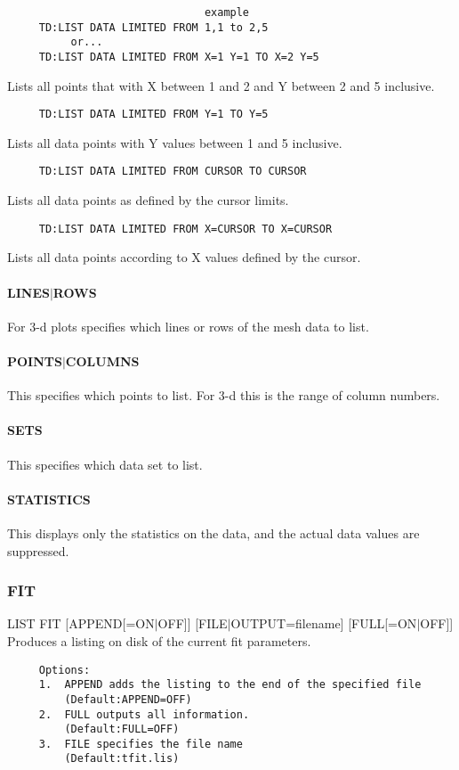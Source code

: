 \begin{verbatim}
                               example
     TD:LIST DATA LIMITED FROM 1,1 to 2,5 
          or...  
     TD:LIST DATA LIMITED FROM X=1 Y=1 TO X=2 Y=5 
\end{verbatim}
Lists  all  points  that with X between 1 and 2 and Y between 2 and 5
inclusive.  
\begin{verbatim}
     TD:LIST DATA LIMITED FROM Y=1 TO Y=5 
\end{verbatim}
Lists all data points with Y values between 1 and 5 inclusive.  
\begin{verbatim}
     TD:LIST DATA LIMITED FROM CURSOR TO CURSOR 
\end{verbatim}
Lists all data points as defined by the cursor limits.  
\begin{verbatim}
     TD:LIST DATA LIMITED FROM X=CURSOR TO X=CURSOR 
\end{verbatim}
Lists all data points according to X values defined by the cursor.  
\paragraph{LINES$|$ROWS}
For 3-d plots specifies which lines or rows of the mesh data to list. 
\paragraph{POINTS$|$COLUMNS}
This  specifies  which  points to list.  For 3-d this is the range of
column numbers.  
\paragraph{SETS}
This specifies which data set to list.  
\paragraph{STATISTICS}
This  displays  only  the statistics on the data, and the actual data
values are suppressed.  
\subsubsection{FIT}
LIST FIT [APPEND[=ON$|$OFF]] [FILE$|$OUTPUT=filename] [FULL[=ON$|$OFF]] 
Produces a listing on disk of the current fit parameters.  
\begin{verbatim}
     Options:  
     1.  APPEND adds the listing to the end of the specified file 
         (Default:APPEND=OFF) 
     2.  FULL outputs all information.  
         (Default:FULL=OFF) 
     3.  FILE specifies the file name 
         (Default:tfit.lis) 
\end{verbatim}

